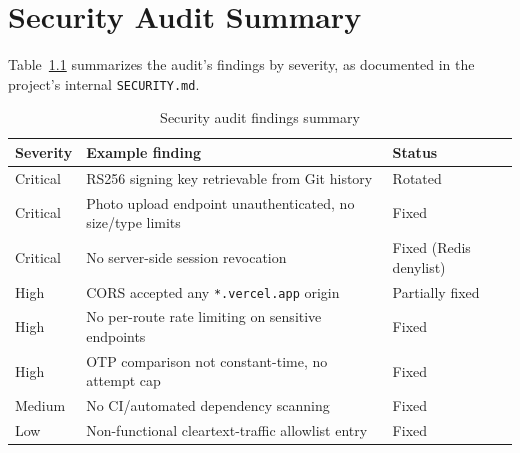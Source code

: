 \chapter{Security Audit Summary}

Table~\ref{tab:security-summary} summarizes the audit's findings by severity, as documented in the project's internal \texttt{SECURITY.md}.

\begin{table}[h!]
\centering
\begin{tabularx}{\textwidth}{lXl}
\toprule
\textbf{Severity} & \textbf{Example finding} & \textbf{Status} \\
\midrule
Critical & RS256 signing key retrievable from Git history & Rotated \\
Critical & Photo upload endpoint unauthenticated, no size/type limits & Fixed \\
Critical & No server-side session revocation & Fixed (Redis denylist) \\
High     & CORS accepted any \texttt{*.vercel.app} origin & Partially fixed \\
High     & No per-route rate limiting on sensitive endpoints & Fixed \\
High     & OTP comparison not constant-time, no attempt cap & Fixed \\
Medium   & No CI/automated dependency scanning & Fixed \\
Low      & Non-functional cleartext-traffic allowlist entry & Fixed \\
\bottomrule
\end{tabularx}
\caption{Security audit findings summary}
\label{tab:security-summary}
\end{table}
